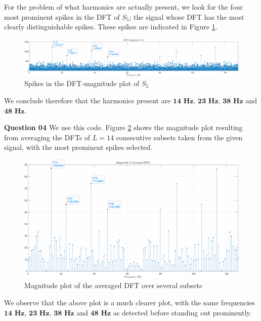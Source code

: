 \documentclass{article}[a4paper]
\begin{document}
	For the problem of what harmonics are actually present, we look for the four most prominent spikes in the DFT of $S_5$; the signal whose DFT has the most clearly distinguishable spikes. These spikes are indicated in Figure \ref{dft_spikes}.
	
	\begin{figure}[H]
		\centering
		\includegraphics[width=\linewidth]{images/q1_3_1_peaks.png}
		\caption{Spikes in the DFT-magnitude plot of $S_5$}
		\label{dft_spikes}
	\end{figure}
	
	We conclude therefore that the harmonics present are $\mathbf{14}\textbf{ Hz}$, $\mathbf{23}\textbf{ Hz}$, $\mathbf{38}\textbf{ Hz}$ and $\mathbf{48}\textbf{ Hz}$.
	\medskip
	
	\textbf{Question 04} We use this code. Figure \ref{avg_dft} shows the magnitude plot resulting from averaging the DFTs of $L = 14$ consecutive subsets taken from the given signal, with the most prominent spikes selected.
	
	\begin{figure}[H]
		\centering
		\includegraphics[width=\linewidth]{images/q1_3_2.png}
		\caption{Magnitude plot of the averaged DFT over several subsets}
		\label{avg_dft}
	\end{figure}
	
	We observe that the above plot is a much clearer plot, with the same frequencies $\mathbf{14}\textbf{ Hz}$, $\mathbf{23}\textbf{ Hz}$, $\mathbf{38}\textbf{ Hz}$ and $\mathbf{48}\textbf{ Hz}$ as detected before standing out prominently.
	
\end{document}
